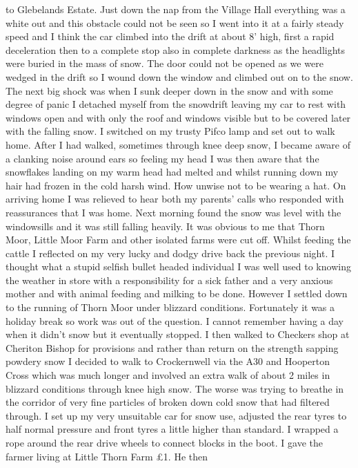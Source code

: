 to Glebelands Estate. Just down the nap from the Village Hall everything was a
white out and this obstacle could not be seen so I went into it at a fairly
steady speed and I think the car climbed into the drift at about 8' high, first
a rapid deceleration then to a complete stop also in complete darkness as the
headlights were buried in the mass of snow. The door could not be opened as we
were wedged in the drift so I wound down the window and climbed out on to the
snow. The next big shock was when I sunk deeper down in the snow and with some
degree of panic I detached myself from the snowdrift leaving my car to rest
with windows open and with only the roof and windows visible but to be covered
later with the falling snow. I switched on my trusty Pifco lamp and set out to
walk home. After I had walked, sometimes through knee deep snow, I became aware
of a clanking noise around ears so feeling my head I was then aware that the
snowflakes landing on my warm head had melted and whilst running down my hair
had frozen in the cold harsh wind. How unwise not to be wearing a hat. On
arriving home I was relieved to hear both my parents' calls who responded with
reassurances that I was home. Next morning found the snow was level with the
windowsills and it was still falling heavily. It was obvious to me that Thorn
Moor, Little Moor Farm and other isolated farms were cut off. Whilst feeding
the cattle I reflected on my very lucky and dodgy drive back the previous
night. I thought what a stupid selfish bullet headed individual I was well used
to knowing the weather in store with a responsibility for a sick father and a
very anxious mother and with animal feeding and milking to be done. However I
settled down to the running of Thorn Moor under blizzard conditions.
Fortunately it was a holiday break so work was out of the question. I cannot
remember having a day when it didn't snow but it eventually stopped. I then
walked to Checkers shop at Cheriton Bishop for provisions and rather than
return on the strength sapping powdery snow I decided to walk to Crockernwell
via the A30 and Hooperton Cross which was much longer and involved an extra
walk of about 2 miles in blizzard conditions through knee high snow. The worse
was trying to breathe in the corridor of very fine particles of broken down
cold snow that had filtered through. I set up my very unsuitable car for snow
use, adjusted the rear tyres to half normal pressure and front tyres a little
higher than standard. I wrapped a rope around the rear drive wheels to connect
blocks in the boot. I gave the farmer living at Little Thorn Farm £1. He then
